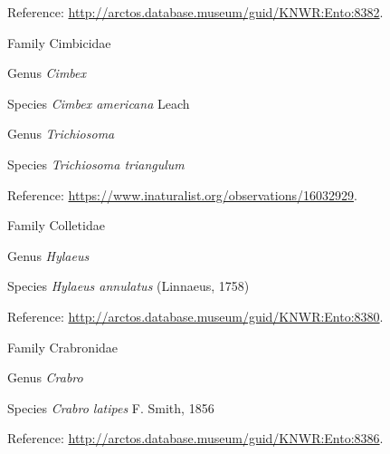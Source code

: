 \documentclass[9pt, article]{memoir}
\begin{document}
\begin{multicols}{2}
\vspace{6pt}Reference: 
\url{http://arctos.database.museum/guid/KNWR:Ento:8382}.

\vspace{6pt}\noindent\hspace{24pt}Family Cimbicidae


\vspace{6pt}\noindent\hspace{30pt}Genus \textit{Cimbex}


\vspace{6pt}\noindent\hspace{36pt}Species \textit{Cimbex americana} Leach


\vspace{6pt}\noindent\hspace{30pt}Genus \textit{Trichiosoma}


\vspace{6pt}\noindent\hspace{36pt}Species \textit{Trichiosoma triangulum}


\vspace{6pt}Reference: 
\url{https://www.inaturalist.org/observations/16032929}.

\vspace{6pt}\noindent\hspace{24pt}Family Colletidae


\vspace{6pt}\noindent\hspace{30pt}Genus \textit{Hylaeus}


\vspace{6pt}\noindent\hspace{36pt}Species \textit{Hylaeus annulatus} (Linnaeus, 1758)


\vspace{6pt}Reference: 
\url{http://arctos.database.museum/guid/KNWR:Ento:8380}.

\vspace{6pt}\noindent\hspace{24pt}Family Crabronidae


\vspace{6pt}\noindent\hspace{30pt}Genus \textit{Crabro}


\vspace{6pt}\noindent\hspace{36pt}Species \textit{Crabro latipes} F. Smith, 1856


\vspace{6pt}Reference: 
\url{http://arctos.database.museum/guid/KNWR:Ento:8386}.


\end{multicols}
\end{document}
